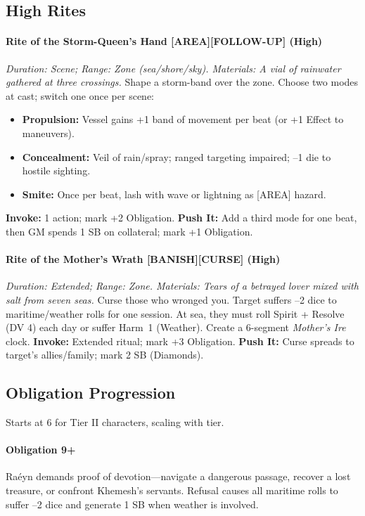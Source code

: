 \subsection*{High Rites}
\paragraph{Rite of the Storm-Queen's Hand [AREA][FOLLOW-UP] (High)}  
\emph{Duration: Scene; Range: Zone (sea/shore/sky). Materials: A vial of rainwater gathered at three crossings.}  
Shape a storm-band over the zone. Choose two modes at cast; switch one once per scene:  
\begin{itemize}
\item \textbf{Propulsion:} Vessel gains +1 band of movement per beat (or +1 Effect to maneuvers).  
\item \textbf{Concealment:} Veil of rain/spray; ranged targeting impaired; --1 die to hostile sighting.  
\item \textbf{Smite:} Once per beat, lash with wave or lightning as [AREA] hazard.  
\end{itemize}
\textbf{Invoke:} 1 action; mark +2 Obligation.  
\textbf{Push It:} Add a third mode for one beat, then GM spends 1 SB on collateral; mark +1 Obligation.

\paragraph{Rite of the Mother's Wrath [BANISH][CURSE] (High)}  
\emph{Duration: Extended; Range: Zone. Materials: Tears of a betrayed lover mixed with salt from seven seas.}  
Curse those who wronged you. Target suffers --2 dice to maritime/weather rolls for one session. At sea, they must roll Spirit + Resolve (DV 4) each day or suffer Harm~1 (Weather). Create a 6-segment \emph{Mother's Ire} clock.  
\textbf{Invoke:} Extended ritual; mark +3 Obligation.  
\textbf{Push It:} Curse spreads to target’s allies/family; mark 2 SB (Diamonds).

\subsection*{Obligation Progression}
Starts at 6 for Tier II characters, scaling with tier.

\paragraph{Obligation 9+} Raéyn demands proof of devotion---navigate a dangerous passage, recover a lost treasure, or confront Khemesh's servants. Refusal causes all maritime rolls to suffer --2 dice and generate 1 SB when weather is involved.  

